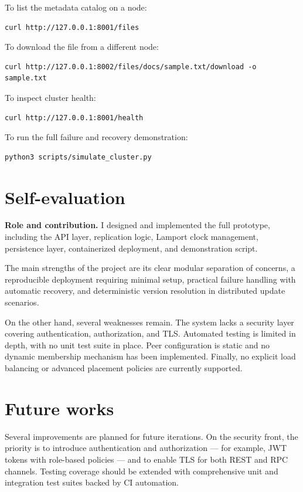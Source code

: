 \documentclass{scrartcl}
\begin{document}
To list the metadata catalog on a node:
\begin{verbatim}
curl http://127.0.0.1:8001/files
\end{verbatim}

To download the file from a different node:
\begin{verbatim}
curl http://127.0.0.1:8002/files/docs/sample.txt/download -o sample.txt
\end{verbatim}

To inspect cluster health:
\begin{verbatim}
curl http://127.0.0.1:8001/health
\end{verbatim}

To run the full failure and recovery demonstration:
\begin{verbatim}
python3 scripts/simulate_cluster.py
\end{verbatim}

\section{Self-evaluation}\label{self-evaluation}

\textbf{Role and contribution.} I designed and implemented the full prototype, including the API layer, replication logic, Lamport clock management, persistence layer, containerized deployment, and demonstration script.

The main strengths of the project are its clear modular separation of concerns, a reproducible deployment requiring minimal setup, practical failure handling with automatic recovery, and deterministic version resolution in distributed update scenarios.

On the other hand, several weaknesses remain. The system lacks a security layer covering authentication, authorization, and TLS. Automated testing is limited in depth, with no unit test suite in place. Peer configuration is static and no dynamic membership mechanism has been implemented. Finally, no explicit load balancing or advanced placement policies are currently supported.

\section{Future works}\label{future-works}

Several improvements are planned for future iterations. On the security front, the priority is to introduce authentication and authorization --- for example, JWT tokens with role-based policies --- and to enable TLS for both REST and RPC channels. Testing coverage should be extended with comprehensive unit and integration test suites backed by CI automation.
\end{document}
